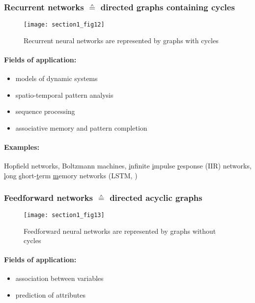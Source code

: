 \subsubsection*{Recurrent networks $\corresponds$ directed graphs containing cycles}
\begin{figure}[h]
  \centering
\texttt{[image: section1\_fig12]}   
  \caption{Recurrent neural networks are represented by graphs with cycles}
\end{figure}

\paragraph{Fields of application:}
\begin{itemize}
	\item models of dynamic systems
	\item spatio-temporal pattern analysis
	\item sequence processing
	\item associative memory and pattern completion
\end{itemize}
\paragraph{Examples:} Hopfield networks, Boltzmann machines,
\underline{i}nfinite \underline{i}mpulse \underline{r}esponse (IIR)
networks, \underline{l}ong \underline{s}hort-\underline{t}erm
\underline{m}emory networks (LSTM, \cite{HochreiterSchmidhuber1997})



\subsubsection*{Feedforward networks $\corresponds$ directed acyclic graphs}
\begin{figure}[h]
  \centering
\texttt{[image: section1\_fig13]}
  \caption{Feedforward neural networks are represented by graphs without cycles}
\end{figure}

\paragraph{Fields of application:}
\begin{itemize}
	\item association between variables
	\item prediction of attributes
\end{itemize}
